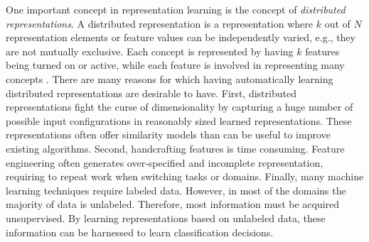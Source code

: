 One important  concept in representation learning  is the concept of
\textit{distributed representations}.  A distributed representation is a representation  where $k$ 
out of $N$ representation elements or feature values can be independently
varied, e.g., they are not mutually exclusive. Each concept is represented by
having $k$ features being turned on or active, while each feature is involved
in representing many concepts \cite{DBLP:journals/corr/abs-1206-5538}.
There are many reasons for which having automatically learning distributed representations are
desirable to have.  First,  distributed representations fight the curse of
dimensionality by capturing a huge number of possible input configurations in
reasonably sized learned representations. These representations often offer
similarity models than can be useful to improve existing algorithms.   Second,  handcrafting features is
time consuming. Feature engineering often generates over-specified and
incomplete representation, requiring to repeat work when switching tasks or
domains. Finally, many machine learning techniques require labeled data.
However, in most of the domains the majority of data is unlabeled.
Therefore, most information must be acquired unsupervised. By learning
representations based on unlabeled data, these information can be harnessed
to learn classification decisions.















